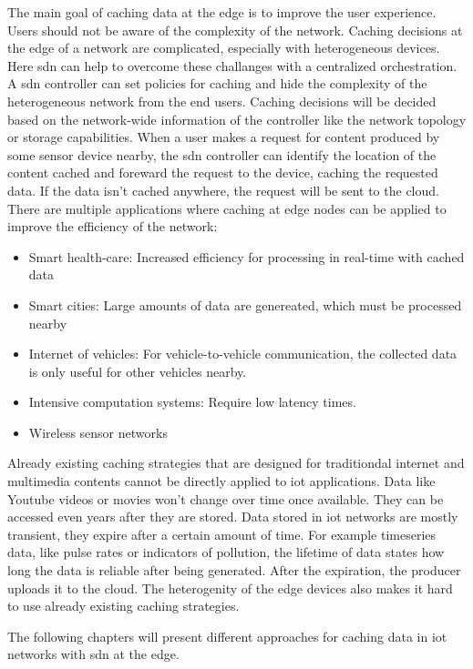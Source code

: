 \documentclass[conference]{IEEEtran}
\begin{document}
	The main goal of caching data at the edge is to improve the user experience. Users should not be aware of the complexity of the network. Caching decisions at the edge of a network are complicated, especially with heterogeneous devices. Here \ac{sdn} can help to overcome these challanges with a centralized orchestration. A \ac{sdn} controller can set policies for caching and hide the complexity of the heterogeneous network from the end users. Caching decisions will be decided based on the network-wide information of the controller like the network topology or storage capabilities. When a user makes a request for content produced by some sensor device nearby, the \ac{sdn} controller can identify the location of the content cached and foreward the request to the device, caching the requested data. If the data isn't cached anywhere, the request will be sent to the cloud. \cite{caching-1}
	There are multiple applications where caching at edge nodes can be applied to improve the efficiency of the network:
	\begin{itemize}
		\item Smart health-care: Increased efficiency for processing in real-time with cached data
		\item Smart cities: Large amounts of data are genereated, which must be processed nearby
		\item Internet of vehicles: For vehicle-to-vehicle communication, the collected data is only useful for other vehicles nearby.
		\item Intensive computation systems: Require low latency times.
		\item Wireless sensor networks \cite{caching-1}
	\end{itemize}

	Already existing caching strategies that are designed for traditiondal internet and multimedia contents cannot be directly applied to \ac{iot} applications. Data like Youtube videos or movies won't change over time once available. They can be accessed even years after they are stored. Data stored in \ac{iot} networks are mostly transient, they expire after a certain amount of time. For example timeseries data, like pulse rates or indicators of pollution, the lifetime of data states how long the data is reliable after being generated. After the expiration, the producer uploads it to the cloud. The heterogenity of the edge devices also makes it hard to use already existing caching strategies. \cite{caching-2}

	The following chapters will present different approaches for caching data in \ac{iot} networks with \ac{sdn} at the edge.
\end{document}
